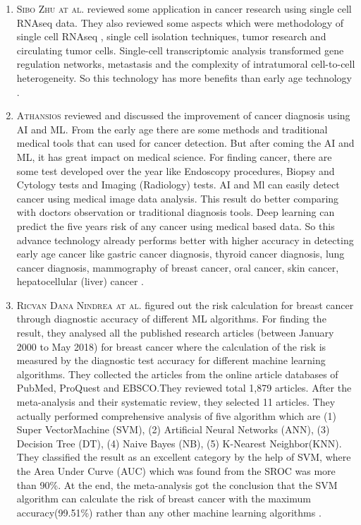 \begin{enumerate}
  \item \textsc{Sibo Zhu at al.} reviewed some application in cancer research using single cell RNAseq data. They also reviewed some aspects which were methodology of single cell RNAseq , single cell isolation techniques, tumor research and circulating tumor cells. Single-cell transcriptomic analysis transformed gene regulation networks, metastasis and the complexity of intratumoral cell-to-cell heterogeneity. So this technology has more benefits than early age technology \cite{OT17893}.
  
  \item \textsc{Athansios} reviewed and discussed the improvement of cancer diagnosis using AI and ML. From the early age there are some methods and traditional medical tools that can used for cancer detection. But after coming the AI and ML, it has great impact on medical science. For finding cancer, there are some test developed over the year like Endoscopy procedures, Biopsy and Cytology tests and Imaging (Radiology) tests. AI and Ml can easily detect cancer using medical image data analysis. This result do better comparing with doctors observation or traditional diagnosis tools. Deep learning can predict the five years risk of any cancer using medical based data. So this advance technology  already performs better with higher accuracy in detecting early age cancer like gastric cancer diagnosis, thyroid cancer diagnosis, lung cancer diagnosis, mammography of breast cancer, oral cancer, skin cancer, hepatocellular (liver) cancer \cite{article}.
  
  \item \textsc{Ricvan Dana Nindrea at al.} figured out the risk calculation for breast cancer through diagnostic accuracy of different ML algorithms. For finding the result,  they analysed all the published research articles (between January 2000 to May 2018) for  breast cancer where the calculation of the risk is measured by the diagnostic test accuracy for different machine learning algorithms. They collected the articles from the online article databases of PubMed, ProQuest and EBSCO.They reviewed total 1,879 articles. After the meta-analysis and their systematic review, they selected 11 articles. They actually performed  comprehensive analysis of five algorithm which are (1) Super VectorMachine (SVM), (2) Artificial Neural Networks (ANN), (3) Decision Tree (DT), (4) Naive Bayes (NB), (5) K-Nearest Neighbor(KNN). They classified the result as an excellent category by the help of SVM, where the Area Under Curve (AUC) which was found from the SROC  was more than 90\%. At the end, the meta-analysis got the conclusion that the SVM algorithm can calculate the risk of  breast cancer with the maximum  accuracy(99.51\%) rather than any other machine learning algorithms \cite{Nindrea2018}.
  

\end{enumerate}
